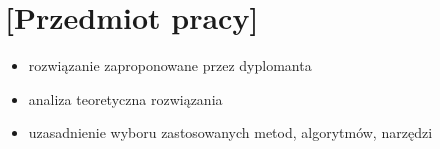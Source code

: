 \chapter{[Przedmiot pracy]}

\begin{itemize}
\item rozwiązanie zaproponowane przez dyplomanta
\item analiza teoretyczna rozwiązania
\item uzasadnienie wyboru zastosowanych metod, algorytmów, narzędzi
\end{itemize}

